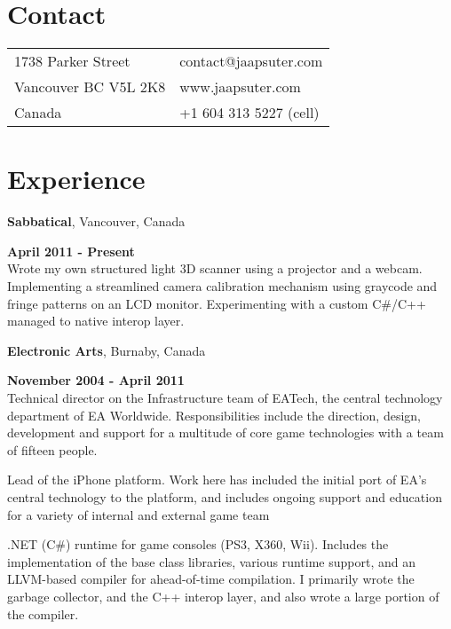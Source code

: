 \documentclass[margin,line]{resume}
\begin{document}

\begin{resume}

\section{\sc Contact}
\vspace{.05in}
\begin{tabular}{@{}p{3in}p{4in}}
1738 Parker Street               & contact@jaapsuter.com  \\
Vancouver BC \hspace{1mm}V5L 2K8 & www.jaapsuter.com      \\
Canada                           & +1 604 313 5227 (cell) \\
\end{tabular}

\section{\sc Experience}

{\bf Sabbatical}, Vancouver, Canada

\vspace{-.3cm} \hfill {\bf April 2011 - Present}\\
Wrote my own structured light 3D scanner using a projector and a webcam. Implementing a
streamlined camera calibration mechanism using graycode and fringe patterns on an LCD 
monitor. Experimenting with a custom C\#/C++ managed to native interop layer.

{\bf Electronic Arts}, Burnaby, Canada

\vspace{-.3cm} \hfill {\bf November 2004 - April 2011}\\
Technical director on the Infrastructure team of EATech, the central
technology department of EA Worldwide. Responsibilities include the
direction, design, development and support for a multitude of core
game technologies with a team of fifteen people.

Lead of the iPhone platform. Work here has included the initial port of EA's central technology to the
platform, and includes ongoing support and education for a variety of internal and external game team

.NET (C\#) runtime for game consoles (PS3, X360, Wii). Includes the implementation of the base class
libraries, various runtime support, and an LLVM-based compiler for ahead-of-time compilation. I
primarily wrote the garbage collector, and the C++ interop layer, and also wrote a large portion of the
compiler.


\end{resume}
\end{document}
